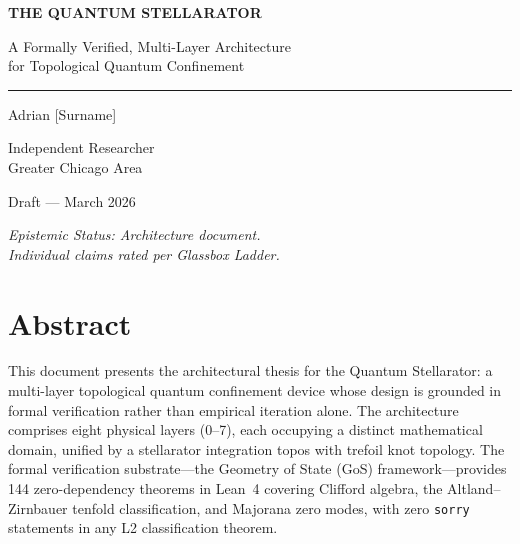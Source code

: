 \documentclass[12pt,letterpaper]{report}
\begin{document}
\thispagestyle{empty}
\begin{titlepage}
\centering
\vspace*{3cm}

{\Huge\bfseries\color{darkblue} THE QUANTUM STELLARATOR\par}
\vspace{0.6cm}
{\Large\color{accentblue} A Formally Verified, Multi-Layer Architecture\\
for Topological Quantum Confinement\par}

\vspace{2cm}
{\color{lightgray}\rule{0.5\textwidth}{0.5pt}\par}
\vspace{1.5cm}

{\large Adrian [Surname]\par}
\vspace{0.3cm}
{\color{gray} Independent Researcher\\
Greater Chicago Area\par}

\vspace{3cm}
{\color{gray} Draft --- March 2026\par}
\vspace{0.4cm}
{\small\itshape\color{gray} Epistemic Status: Architecture document.\\
Individual claims rated per Glassbox Ladder.\par}

\end{titlepage}


\tableofcontents
\clearpage
{}



\chapter{Abstract}

This document presents the architectural thesis for the Quantum Stellarator: a multi-layer topological quantum confinement device whose design is grounded in formal verification rather than empirical iteration alone. The architecture comprises eight physical layers (0--7), each occupying a distinct mathematical domain, unified by a stellarator integration topos with trefoil knot topology. The formal verification substrate---the Geometry of State (GoS) framework---provides 144 zero-dependency theorems in Lean~4 covering Clifford algebra, the Altland--Zirnbauer tenfold classification, and Majorana zero modes, with zero \texttt{sorry} statements in any L2 classification theorem.
\end{document}

